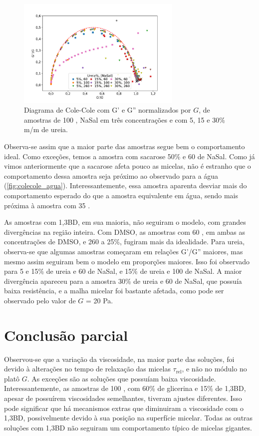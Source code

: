 		\begin{figure}[h]
			\centering
			\includegraphics[width=0.7\textwidth]{imagens/reologia/colecole_ureia}
			\caption{Diagrama de Cole-Cole com G' e G'' normalizados por \(G\), de amostras de \CTAB{} 100 \mM{}, NaSal em três concentrações e com 5, 15 e 30\% m/m de ureia.}
			\label{fig:colecole_ureia}
		\end{figure}

		Observa-se assim que a maior parte das amostras segue bem o comportamento ideal. Como exceções, temos a amostra com sacarose 50\% e 60 \mM{} de NaSal. Como já vimos anteriormente que a sacarose afeta pouco as micelas, não é estranho que o comportamento dessa amostra seja próximo ao observado para a água (\autoref{fig:colecole_agua}). Interessantemente, essa amostra aparenta desviar mais do comportamento esperado do que a amostra equivalente em água, sendo mais próxima à amostra com 35 \mM.
		
		As amostras com 1,3BD, em sua maioria, não seguiram o modelo, com grandes divergências na região inteira. Com DMSO, as amostras com 60 \mM, em ambas as concentrações de DMSO, e 260 \mM{} a 25\%, fugiram mais da idealidade. Para ureia, observa-se que algumas amostras começaram em relações G'/G'' maiores, mas mesmo assim seguiram bem o modelo em proporções maiores. Isso foi observado para 5 e 15\% de ureia e 60\mM{} de NaSal, e 15\% de ureia e 100 \mM{} de NaSal. A maior divergência apareceu para a amostra 30\% de ureia e 60 \mM{} de NaSal, que possuía baixa resistência, e a malha micelar foi bastante afetada, como pode ser observado pelo valor de \(G\) = 20 Pa.
		
		\section{Conclusão parcial}
		
		Observou-se que a variação da viscosidade, na maior parte das soluções, foi devido à alterações no tempo de relaxação das micelas \(\tau_{\textrm{rel}}\), e não no módulo no platô \(G\). As exceções são as soluções que possuíam baixa viscosidade. Interessantemente, as amostras de 100 \mM{}, com 60\% de glicerina e 15\% de 1,3BD, apesar de possuírem viscosidades semelhantes, tiveram ajustes diferentes. Isso pode significar que há mecanismos extras que diminuiram a viscosidade com o 1,3BD, possivelmente devido à sua posição na superfície micelar. Todas as outras soluções com 1,3BD não seguiram um comportamento típico de micelas gigantes.
		
